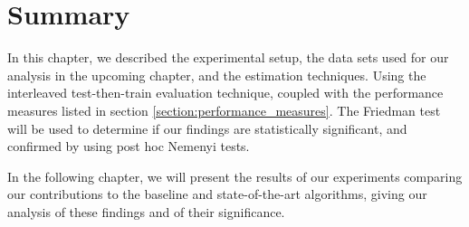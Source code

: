 \section{Summary}
In this chapter, we described the experimental setup, the data sets used for our analysis in the upcoming chapter, and the estimation techniques. Using the interleaved test-then-train evaluation technique, coupled with the performance measures listed in section \ref{section:performance_measures}. The Friedman test will be used to determine if our findings are statistically significant, and confirmed by using post hoc Nemenyi tests.

In the following chapter, we will present the results of our experiments comparing our contributions to the baseline and state-of-the-art algorithms, giving our analysis of these findings and of their significance.

